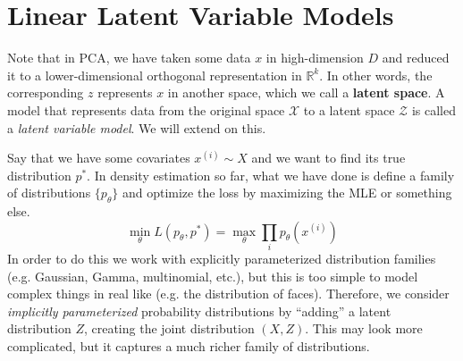 \section{Linear Latent Variable Models}

  Note that in PCA, we have taken some data $x$ in high-dimension $D$ and reduced it to a lower-dimensional orthogonal representation in $\mathbb{R}^k$. In other words, the corresponding $z$ represents $x$ in another space, which we call a \textbf{latent space}. A model that represents data from the original space $\mathcal{X}$ to a latent space $\mathcal{Z}$ is called a \textit{latent variable model}. We will extend on this. 

  Say that we have some covariates $x^{(i)} \sim X$ and we want to find its true distribution $p^\ast$. In density estimation so far, what we have done is define a family of distributions $\{p_\theta\}$ and optimize the loss by maximizing the MLE or something else. 
  \begin{equation}
    \min_\theta L(p_\theta, p^\ast) = \max_\theta \prod_{i} p_\theta(x^{(i)})
  \end{equation}
  In order to do this we work with explicitly parameterized distribution families (e.g. Gaussian, Gamma, multinomial, etc.), but this is too simple to model complex things in real like (e.g. the distribution of faces). Therefore, we consider \textit{implicitly parameterized} probability distributions by ``adding'' a latent distribution $Z$, creating the joint distribution $(X, Z)$. This may look more complicated, but it captures a much richer family of distributions. 

